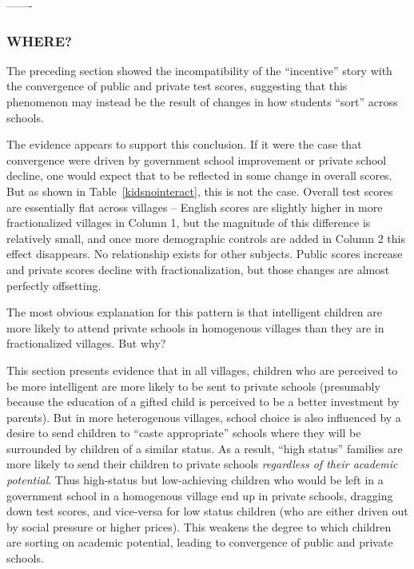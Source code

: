 -------

\subsubsection{WHERE?}

The preceding section showed the incompatibility of the ``incentive'' story with the convergence of public and private test scores, suggesting that this phenomenon may instead be the result of changes in how students ``sort'' across schools.

The evidence appears to support this conclusion. If it were the case that convergence were driven by government school improvement or private school decline, one would expect that to be reflected in some change in overall scores. But as shown in Table~\ref{kidsnointeract}, this is not the case. Overall test scores are essentially flat across villages -- English scores are slightly higher in more fractionalized villages in Column 1, but the magnitude of this difference is relatively small, and once more demographic controls are added in Column 2 this effect disappears. No relationship exists for other subjects. Public scores increase and private scores decline with fractionalization, but those changes are almost perfectly offsetting.  



The most obvious explanation for this pattern is that intelligent children are more likely to attend private schools in homogenous villages than they are in fractionalized villages. But why?

This section presents evidence that in all villages, children who are perceived to be more intelligent are more likely to be sent to private schools (presumably because the education of a gifted child is perceived to be a better investment by parents). But in more heterogenous villages, school choice is also influenced by a desire to send children to ``caste appropriate'' schools where they will be surrounded by children of a similar status. As a result, ``high status'' families are more likely to send their children to private schools \emph{regardless of their academic potential}. Thus high-status but low-achieving children who would be left in a government school in a homogenous village end up in private schools, dragging down test scores, and vice-versa for low status children (who are either driven out by social pressure or higher prices). This weakens the degree to which children are sorting on academic potential, leading to convergence of public and private schools.

